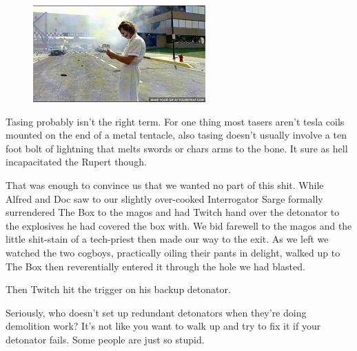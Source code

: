 \begin{figure}
	\begin{center}
		\includegraphics[width=\figwidth]{pics/4/31.png}
	\end{center}
\end{figure}
Tasing probably isn't the right term. 
For one thing most tasers aren't tesla coils mounted on the end of a metal tentacle, also tasing doesn't usually involve a ten foot bolt of lightning that melts swords or chars arms to the bone. 
It sure as hell incapacitated the Rupert though. 

That was enough to convince us that we wanted no part of this shit. 
While Alfred and Doc saw to our slightly over-cooked Interrogator Sarge formally surrendered The Box to the magos and had Twitch hand over the detonator to the explosives he had covered the box with. 
We bid farewell to the magos and the little shit-stain of a tech-priest then made our way to the exit. 
As we left we watched the two cogboys, practically oiling their pants in delight, walked up to The Box then reverentially entered it through the hole we had blasted.

Then Twitch hit the trigger on his backup detonator.

Seriously, who doesn't set up redundant detonators when they're doing demolition work? 
It's not like you want to walk up and try to fix it if your detonator fails. 
Some people are just so stupid.

